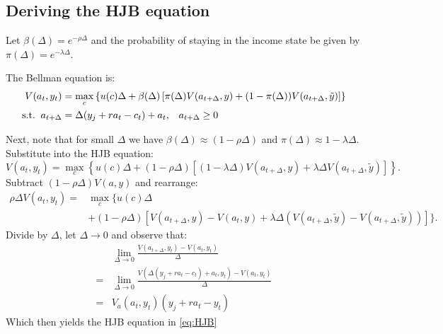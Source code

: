 \documentclass[12pt]{article}
\DeclareMathOperator{\1}{\mathbbm{1}}
\begin{document}


\begin{appendix}
\section{Deriving the HJB equation}\label{sec:HJBderivation}
Let $\beta(\Delta)=e^{-\rho \Delta}$ and the probability of staying in the income state be given by $\pi(\Delta)=e^{-\lambda \Delta}$.

The Bellman equation is:
\begin{align*}
V(a_t,y_t) &= \max_c \left\{u(c)\Delta +\beta(\Delta)\left[\pi(\Delta)V(a_{t+\Delta},y)+ (1-\pi(\Delta)) V(a_{t+\Delta},\tilde y)\right]  \right\} \\
\text{s.t.\;\;} a_{t+\Delta} &= \Delta(y_j + ra_t - c_t) + a_t,\;\;\; a_{t+\Delta}\ge 0
\end{align*}

Next, note that for small $\Delta$ we have $\beta(\Delta) \approx (1-\rho\Delta)$ and $\pi(\Delta)\approx 1-\lambda\Delta$. Substitute into the HJB equation:
$$ V(a_t,y_t) = \max_c \left\{u(c)\Delta +(1-\rho\Delta)\left[(1-\lambda\Delta)V(a_{t+\Delta},y)+ \lambda\Delta V(a_{t+\Delta},\tilde y)\right]  \right\}.$$
Subtract $(1-\rho\Delta) V(a,y)$ and rearrange:
\begin{align*} \rho \Delta V(a_t,y_t) =& \max_c \big\{u(c)\Delta   \\
& +(1-\rho\Delta)\left[V(a_{t+\Delta},y) - V(a_{t},y) + \lambda\Delta \left( V(a_{t+\Delta},\tilde y) - V(a_{t+\Delta},\tilde y) \right)\right] \big\}.
\end{align*}
Divide by $\Delta$, let $\Delta \to 0$ and observe that:
\begin{align*}
& \lim_{\Delta\to 0}  \frac{V(a_{t+\Delta},y_t) - V(a_t,y_t)}{\Delta} \\
=& \lim_{\Delta\to 0}  \frac{V(\Delta(y_j + ra_t - c_t) + a_t,y_t) - V(a_t,y_t)}{\Delta} \\
=& V_a(a_t,y_t)(y_j + ra_t - y_t)
\end{align*}
Which then yields the HJB equation in \eqref{eq:HJB}
\end{appendix}
\end{document}
